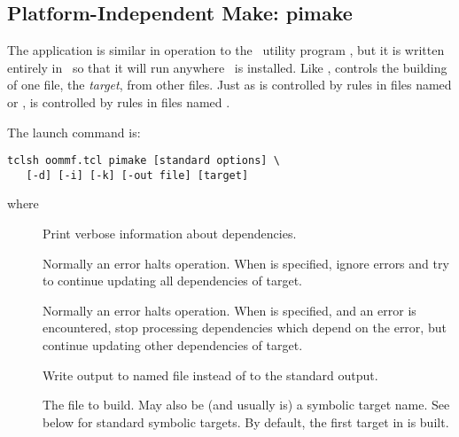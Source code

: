 
\subsection{Platform-Independent Make:
            pimake\label{sec:pimake}}%

The application 
is similar in operation to the
\Unix\ utility program ,
but it is written entirely in
\Tcl\ so that it will run anywhere \Tcl\ is installed.
Like ,  controls the building of one
file, the {\em target}, from other files.
Just as  is controlled by rules in
files named  or ,  is controlled
by rules in files named .

The  launch command is:
\begin{verbatim}
tclsh oommf.tcl pimake [standard options] \
   [-d] [-i] [-k] [-out file] [target]
\end{verbatim}
where
\begin{description}
\item[]
  Print verbose information about dependencies.
\item[]
  Normally an error halts operation.  When  is specified,
  ignore errors and try to continue updating all dependencies
  of target.
\item[]
  Normally an error halts operation.
  When  is specified, and an error is encountered, stop
  processing dependencies which depend on the error, but continue
  updating other dependencies of target.
\item[]
  Write output to named file instead of to the standard output.
\item[]
  The file to build.  May also be (and usually is) a symbolic
  target name.  See below for standard symbolic targets.  By default,
  the first target in \fn{makerules.tcl} is built.
\end{description}

